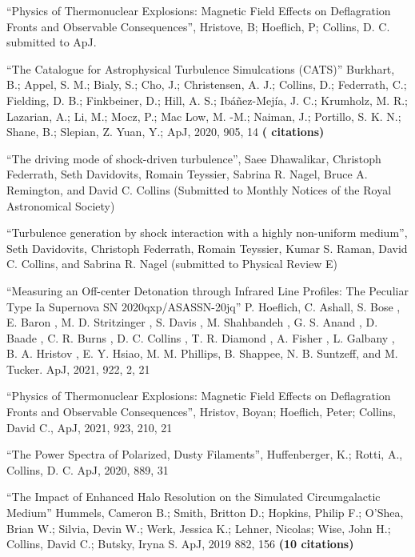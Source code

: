 \newcommand{\citeform}[1]{{\bf (#1 citations)}}

\medskip
\noindent

``Physics of Thermonuclear Explosions: Magnetic Field Effects on Deflagration Fronts and Observable Consequences'', Hristove, B; Hoeflich, P; Collins, D. C. submitted to ApJ.

\medskip
\noindent
``The Catalogue for Astrophysical Turbulence Simulcations (CATS)'' Burkhart, B.; Appel, S. M.; Bialy, S.; Cho, J.; Christensen, A. J.; Collins, D.; Federrath, C.; Fielding, D. B.; Finkbeiner, D.; Hill, A. S.; Ibáñez-Mejía, J. C.; Krumholz, M. R.; Lazarian, A.; Li, M.; Mocz, P.; Mac Low, M. -M.; Naiman, J.; Portillo, S. K. N.; Shane, B.; Slepian, Z. Yuan, Y.;  ApJ, 2020, 905, 14
\citeform{}%

``The driving mode of shock-driven turbulence'',
Saee Dhawalikar, Christoph Federrath, Seth Davidovits, Romain
Teyssier, Sabrina R. Nagel, Bruce A. Remington, and David C. Collins
(Submitted to Monthly Notices of the Royal Astronomical Society)

\medskip
\noindent
``Turbulence generation by shock interaction with a highly non-uniform
medium'', Seth Davidovits, Christoph Federrath, Romain Teyssier,
Kumar S. Raman, David C. Collins, and Sabrina R. Nagel  (submitted to Physical
Review E)

\medskip
\noindent
``Measuring an Off-center Detonation through Infrared Line Profiles: The
Peculiar Type Ia Supernova SN 2020qxp/ASASSN-20jq'' P. Hoeflich, C. Ashall,
S. Bose , E. Baron , M. D. Stritzinger , S. Davis , M. Shahbandeh , G. S.
Anand ,
D. Baade , C. R. Burns , D. C. Collins , T. R. Diamond , A. Fisher , L.
Galbany , B. A. Hristov ,
E. Y. Hsiao, M. M. Phillips, B. Shappee, N. B. Suntzeff, and M.
Tucker.  ApJ, 2021, 922, 2, 21

\medskip
\noindent
``Physics of Thermonuclear Explosions: Magnetic Field Effects on Deflagration
Fronts and Observable Consequences'', Hristov, Boyan; Hoeflich, Peter; Collins,
David C., ApJ, 2021, 923, 210, 21



\medskip
\noindent
``The Power Spectra of Polarized, Dusty Filaments'', Huffenberger, K.; Rotti,
A., Collins, D. C. ApJ, 2020, 889, 31

\medskip
\noindent
``The Impact of Enhanced Halo Resolution on the Simulated Circumgalactic Medium''
Hummels, Cameron B.; Smith, Britton D.; Hopkins, Philip F.; O'Shea, Brian W.; Silvia, Devin W.; 
Werk, Jessica K.; Lehner, Nicolas; Wise, John H.; Collins, David C.; Butsky, Iryna S.   
ApJ, 2019 882, 156
\citeform{10}%

